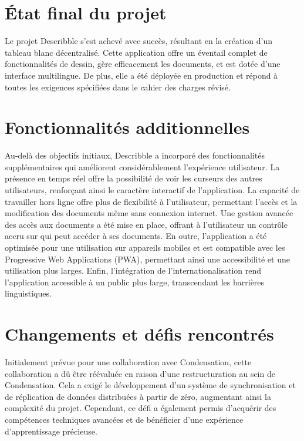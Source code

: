 \section{État final du projet}

Le projet \gls{Describble} s'est achevé avec succès, résultant en la création d'un tableau blanc décentralisé. Cette application offre un éventail complet de fonctionnalités de dessin, gère efficacement les documents, et est dotée d'une interface multilingue. De plus, elle a été déployée en production et répond à toutes les exigences spécifiées dans le cahier des charges révisé.

\section{Fonctionnalités additionnelles}

Au-delà des objectifs initiaux, \gls{Describble} a incorporé des fonctionnalités supplémentaires qui améliorent considérablement l'expérience utilisateur. La présence en temps réel offre la possibilité de voir les curseurs des autres utilisateurs, renforçant ainsi le caractère interactif de l'application. La capacité de travailler hors ligne offre plus de flexibilité à l'utilisateur, permettant l'accès et la modification des documents même sans connexion internet. Une gestion avancée des accès aux documents a été mise en place, offrant à l'utilisateur un contrôle accru sur qui peut accéder à ses documents. En outre, l'application a été optimisée pour une utilisation sur appareils mobiles et est compatible avec les Progressive Web Applications (\gls{PWA}), permettant ainsi une accessibilité et une utilisation plus larges. Enfin, l'intégration de l'internationalisation rend l'application accessible à un public plus large, transcendant les barrières linguistiques.

\section{Changements et défis rencontrés}

Initialement prévue pour une collaboration avec Condensation, cette collaboration a dû être réévaluée en raison d'une restructuration au sein de Condensation. Cela a exigé le développement d'un système de synchronisation et de réplication de données distribuées à partir de zéro, augmentant ainsi la complexité du projet. Cependant, ce défi a également permis d'acquérir des compétences techniques avancées et de bénéficier d'une expérience d'apprentissage précieuse.

